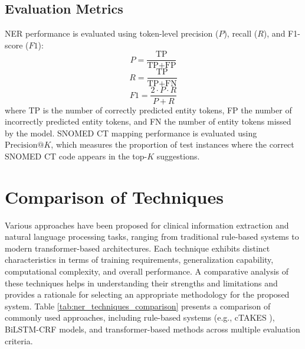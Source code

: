 \subsection{Evaluation Metrics}
NER performance is evaluated using token-level precision ($P$), recall ($R$), and F1-score ($F1$):
\begin{equation}
P = \frac{\text{TP}}{\text{TP} + \text{FP}}
\label{eq:precision}
\end{equation}
\begin{equation}
R = \frac{\text{TP}}{\text{TP} + \text{FN}}
\label{eq:recall}
\end{equation}
\begin{equation}
F1 = \frac{2 \cdot P \cdot R}{P + R}
\label{eq:f1_score}
\end{equation}
where TP is the number of correctly predicted entity tokens, FP the number of incorrectly predicted entity tokens, and FN the number of entity tokens missed by the model. SNOMED CT mapping performance is evaluated using $\text{Precision}@K$, which measures the proportion of test instances where the correct SNOMED CT code appears in the top-$K$ suggestions.

\section{Comparison of Techniques}
Various approaches have been proposed for clinical information extraction and natural language processing tasks, ranging from traditional rule-based systems to modern transformer-based architectures. Each technique exhibits distinct characteristics in terms of training requirements, generalization capability, computational complexity, and overall performance. A comparative analysis of these techniques helps in understanding their strengths and limitations and provides a rationale for selecting an appropriate methodology for the proposed system. Table \ref{tab:ner_techniques_comparison} presents a comparison of commonly used approaches, including rule-based systems (e.g., cTAKES \cite{ref6}), BiLSTM-CRF models, and transformer-based methods across multiple evaluation criteria.

